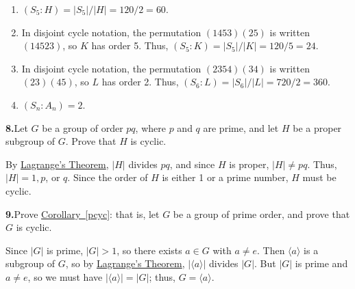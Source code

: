 \documentclass[10pt,]{book}
\theoremstyle{plain}
\theoremstyle{definition}
\theoremstyle{definition}
\theoremstyle{definition}
\theoremstyle{definition}
\numberwithin{equation}{section}
\begin{document}
%
\par\smallskip
\leavevmode%
\begin{enumerate}[label=(\alph*)]
\item\hypertarget{li-484}{}\((S_5:H)=|S_5|/|H|=120/2=60.\)%
\item\hypertarget{li-485}{}In disjoint cycle notation, the permutation \((1453)(25)\) is written \((14523)\), so \(K\) has order 5. Thus, \((S_5:K)=|S_5|/|K|=120/5=24.\)%
\item\hypertarget{li-486}{}In disjoint cycle notation, the permutation \((2354)(34)\) is written \((23)(45)\), so \(L\) has order 2. Thus, \((S_6:L)=|S_6|/|L|=720/2=360.\)%
\item\hypertarget{li-487}{}\((S_n:A_n)=2\).%
\end{enumerate}
\par\smallskip
\noindent\textbf{8.}\quad{}Let \(G\) be a group of order \(pq\), where \(p\) and \(q\) are prime, and let \(H\) be a proper subgroup of \(G\). Prove that \(H\) is cyclic.%
\par\smallskip
By \hyperref[lagrange]{Lagrange's Theorem}, \(|H|\) divides \(pq\), and since \(H\) is proper, \(|H|\neq  pq\). Thus, \(|H|=1,p\), or \(q\). Since the order of \(H\) is either 1 or a prime number, \(H\) must be cyclic.%
\par\smallskip
\noindent\textbf{9.}\quad{}Prove \hyperref[pcyc]{Corollary~\ref{pcyc}}: that is, let \(G\) be a group of prime order, and prove that \(G\) is cyclic.%
\par\smallskip
Since \(|G|\) is prime, \(|G|>1\), so there exists \(a\in G\) with \(a\neq e\). Then \(\langle a\rangle\) is a subgroup of \(G\), so by \hyperref[lagrange]{Lagrange's Theorem}, \(|\langle a\rangle |\) divides \(|G|\). But \(|G|\) is prime and \(a\neq e\), so we must have \(|\langle a\rangle |=|G|\); thus, \(G=\langle a\rangle\).%
\par\smallskip
\end{document}
